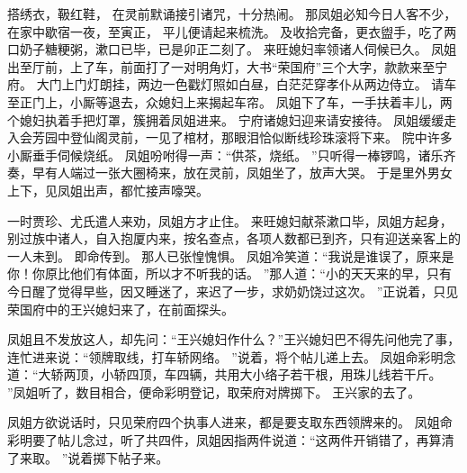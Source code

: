 搭绣衣，靸红鞋，
在灵前默诵接引诸咒，十分热闹。
那凤姐必知今日人客不少，在家中歇宿一夜，至寅正，
平儿便请起来梳洗。
及收拾完备，更衣盥手，吃了两口奶子糖粳粥，漱口已毕，已是卯正二刻了。
来旺媳妇率领诸人伺候已久。
凤姐出至厅前，上了车，前面打了一对明角灯，大书“荣国府”三个大字，款款来至宁府。
大门上门灯朗挂，两边一色戳灯照如白昼，白茫茫穿孝仆从两边侍立。
请车至正门上，小厮等退去，众媳妇上来揭起车帘。
凤姐下了车，一手扶着丰儿，两个媳妇执着手把灯罩，簇拥着凤姐进来。
宁府诸媳妇迎来请安接待。
凤姐缓缓走入会芳园中登仙阁灵前，一见了棺材，那眼泪恰似断线珍珠滚将下来。
院中许多小厮垂手伺候烧纸。
凤姐吩咐得一声：“供茶，烧纸。
”只听得一棒锣鸣，诸乐齐奏，早有人端过一张大圈椅来，放在灵前，凤姐坐了，放声大哭。
于是里外男女上下，见凤姐出声，都忙接声嚎哭。
\par
一时贾珍、尤氏遣人来劝，凤姐方才止住。
来旺媳妇献茶漱口毕，凤姐方起身，别过族中诸人，自入抱厦内来，按名查点，各项人数都已到齐，只有迎送亲客上的一人未到。
即命传到。
那人已张惶愧惧。
凤姐冷笑道：“我说是谁误了，原来是你！你原比他们有体面，所以才不听我的话。
”那人道：“小的天天来的早，只有今日醒了觉得早些，因又睡迷了，来迟了一步，求奶奶饶过这次。
”正说着，只见荣国府中的王兴媳妇来了，在前面探头。
\par
凤姐且不发放这人，却先问：“王兴媳妇作什么？”王兴媳妇巴不得先问他完了事，连忙进来说：“领牌取线，打车轿网络。
”说着，将个帖儿递上去。
凤姐命彩明念道：“大轿两顶，小轿四顶，车四辆，共用大小络子若干根，用珠儿线若干斤。
”凤姐听了，数目相合，便命彩明登记，取荣府对牌掷下。
王兴家的去了。
\par
凤姐方欲说话时，只见荣府四个执事人进来，都是要支取东西领牌来的。
凤姐命彩明要了帖儿念过，听了共四件，凤姐因指两件说道：“这两件开销错了，再算清了来取。
”说着掷下帖子来。
